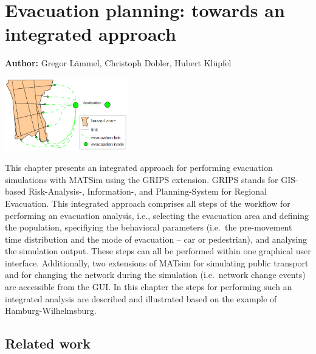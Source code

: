 \chapter{Evacuation planning: towards an integrated approach}
\label{ch:evacuation}

\hfill \textbf{Author:} Gregor L\"ammel, Christoph Dobler, Hubert Kl\"upfel 

\begin{center} \includegraphics[width=0.4\textwidth, angle=0]{extending/figures/Evacuation/evacuation} \end{center}

This chapter presents an integrated approach for performing evacuation simulations with MATSim using the GRIPS extension. GRIPS stands for  GIS-based Risk-Analysis-, Information-, and Planning-System for Regional Evacuation. 
This integrated approach comprises all steps of the workflow for performing an evacuation analysis, i.e., 
selecting the evacuation area and defining the population, specifiying the behavioral parameters 
(i.e.\ the pre-movement time distribution and the mode of evacuation -- car or pedestrian), 
and analysing the simulation output.
These steps can all be performed within one graphical user interface.
Additionally, two extensions of MATsim for simulating public transport and for changing the network 
during the simulation (i.e.\ network change events) are accessible from the GUI.
In this chapter the steps for performing such an integrated analysis are described and illustrated based on
the example of Hamburg-Wilhelmsburg.

\section{Related work}

